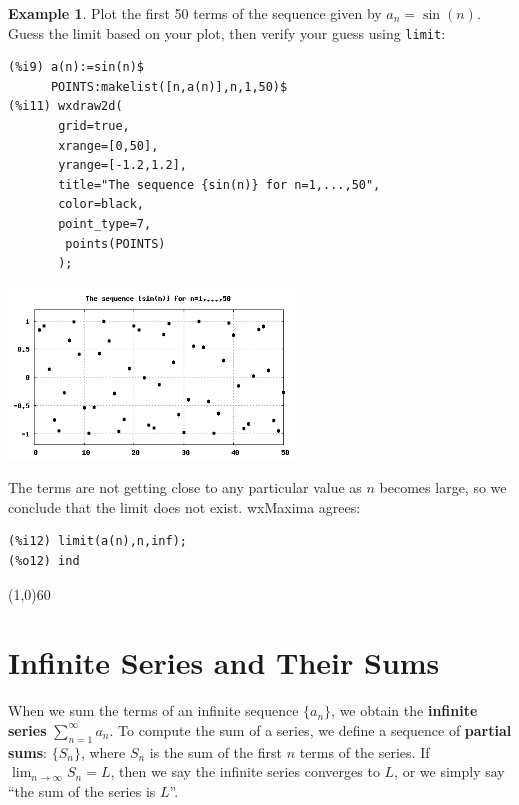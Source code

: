 \documentclass[10.5pt,twoside]{report}
\theoremstyle{definition}
\newtheorem{exmp}{Example}[section]
\begin{document}
\begin{exmp} Plot the first 50 terms of the sequence given by $a_n=\sin(n)$.  Guess the limit based on your plot, then verify your guess using \verb|limit|:

\begin{verbatim}
(%i9) a(n):=sin(n)$
      POINTS:makelist([n,a(n)],n,1,50)$
(%i11) wxdraw2d(
       grid=true,
       xrange=[0,50],
       yrange=[-1.2,1.2],
       title="The sequence {sin(n)} for n=1,...,50",
       color=black,
       point_type=7,
        points(POINTS)
       );
\end{verbatim}
\includegraphics[width=3in]{example_6_1_3_1}

The terms are not getting close to any particular value as $n$ becomes large, so we conclude that the limit does not exist.  wxMaxima agrees:

\begin{verbatim}
(%i12) limit(a(n),n,inf);
(%o12) ind
\end{verbatim}


\end{exmp}

\line(1,0){60}
\linethickness{0.5mm}
\pagebreak



\section{Infinite Series and Their Sums}\label{Infinite Series and Their Sums}

When we sum the terms of an infinite sequence $\lbrace a_n \rbrace$, we obtain the \textbf{infinite series} $\sum_{n=1}^{\infty} a_n$.  To compute the sum of a series, we define a sequence of \textbf{partial sums}: $\lbrace S_n \rbrace$, where $S_n$ is the sum of the first $n$ terms of the series.  If $\lim_{n\to \infty} S_n = L$, then we say the infinite series converges to $L$, or we simply say ``the sum of the series is $L$''.
\end{document}
